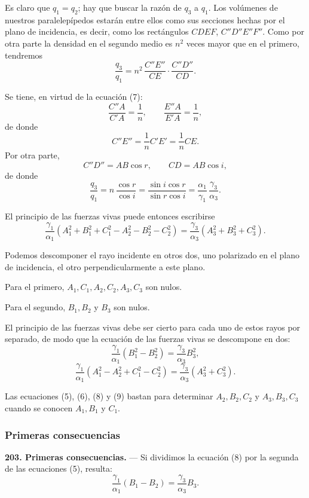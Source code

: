 Es claro que $q_1=q_2$; hay que buscar la razón de $q_3$ a $q_1$. Los
volúmenes de nuestros paralelepípedos estarán entre ellos como sus
secciones hechas por el plano de incidencia, es decir, como los
rectángulos $CDEF$, $C''D''E''F''$. Como por otra parte la densidad en el
segundo medio es $n^2$ veces mayor que en el primero, tendremos
\[
\frac{q_3}{q_1}=n^2\,\frac{C''E''}{CE}\cdot\frac{C''D''}{CD}.
\]

Se tiene, en virtud de la ecuación (7):
\[
\frac{C''A}{C'A}=\frac{1}{n},\qquad \frac{E''A}{E'A}=\frac{1}{n},
\]
de donde
\[
C''E''=\frac{1}{n}C'E'=\frac{1}{n}CE.
\]
Por otra parte,
\[
C''D''=AB\cos r,\qquad CD=AB\cos i,
\]
de donde
\[
\frac{q_3}{q_1}=n\,\frac{\cos r}{\cos i}
=\frac{\sin i\cos r}{\sin r\cos i}=\frac{\alpha_1}{\gamma_1}\,\frac{\gamma_3}{\alpha_3}.
\]

El principio de las fuerzas vivas puede entonces escribirse
\[
\frac{\gamma_1}{\alpha_1}(A_1^2+B_1^2+C_1^2-A_2^2-B_2^2-C_2^2)
=\frac{\gamma_3}{\alpha_3}(A_3^2+B_3^2+C_3^2).
\]

Podemos descomponer el rayo incidente en otros dos, uno polarizado en el
plano de incidencia, el otro perpendicularmente a este plano.

Para el primero, $A_1,C_1,A_2,C_2,A_3,C_3$ son nulos.

Para el segundo, $B_1,B_2$ y $B_3$ son nulos.

El principio de las fuerzas vivas debe ser cierto para cada uno de estos
rayos por separado, de modo que la ecuación de las fuerzas vivas se
descompone en dos:
\begin{equation}
\frac{\gamma_1}{\alpha_1}(B_1^2-B_2^2)=\frac{\gamma_3}{\alpha_3}B_3^2,
\end{equation}
\begin{equation}
\frac{\gamma_1}{\alpha_1}(A_1^2-A_2^2+C_1^2-C_2^2)
=\frac{\gamma_3}{\alpha_3}(A_3^2+C_3^2).
\end{equation}

Las ecuaciones (5), (6), (8) y (9) bastan para determinar $A_2,B_2,C_2$ y
$A_3,B_3,C_3$ cuando se conocen $A_1,B_1$ y $C_1$.

\subsubsection{Primeras consecuencias}

\noindent\textbf{203. Primeras consecuencias.} — Si dividimos la ecuación
(8) por la segunda de las ecuaciones (5), resulta:
\begin{equation}
\frac{\gamma_1}{\alpha_1}(B_1-B_2)=\frac{\gamma_3}{\alpha_3}B_3.
\end{equation}


